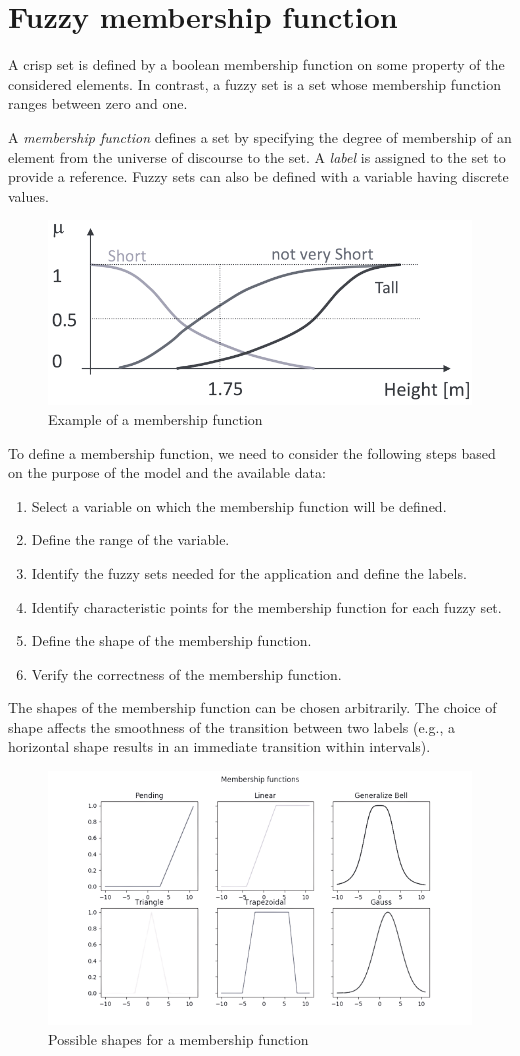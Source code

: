 \section{Fuzzy membership function}

A crisp set is defined by a boolean membership function on some property of the considered elements. 
In contrast, a fuzzy set is a set whose membership function ranges between zero and one.
\begin{definition}
    A \emph{membership function} defines a set by specifying the degree of membership of an element from the universe of discourse to the set. 
    A \emph{label} is assigned to the set to provide a reference. 
    Fuzzy sets can also be defined with a variable having discrete values.
\end{definition}
\begin{figure}[H]
    \centering
    \includegraphics[width=0.4\linewidth]{images/function.png}
    \caption{Example of a membership function}
\end{figure}
To define a membership function, we need to consider the following steps based on the purpose of the model and the available data:
\begin{enumerate}
    \item Select a variable on which the membership function will be defined.
    \item Define the range of the variable.
    \item Identify the fuzzy sets needed for the application and define the labels.
    \item Identify characteristic points for the membership function for each fuzzy set.
    \item Define the shape of the membership function.
    \item Verify the correctness of the membership function.
\end{enumerate}
The shapes of the membership function can be chosen arbitrarily. 
The choice of shape affects the smoothness of the transition between two labels (e.g., a horizontal shape results in an immediate transition within intervals).
\begin{figure}[H]
    \centering
    \includegraphics[width=0.75\linewidth]{images/shape.png}
    \caption{Possible shapes for a membership function}
\end{figure}
